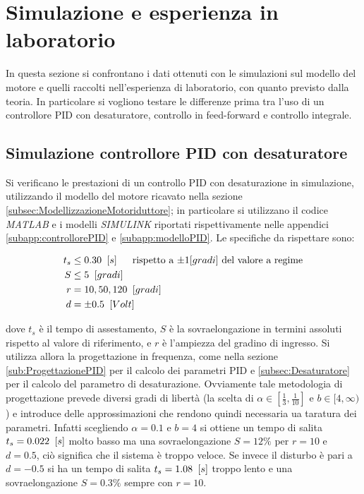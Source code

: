 \section{Simulazione e esperienza in laboratorio}
\label{sec:simLab}

	In questa sezione si confrontano i dati ottenuti con le simulazioni sul modello del motore e quelli raccolti nell'esperienza di laboratorio, con quanto previsto dalla teoria. In particolare si vogliono testare le differenze prima tra l'uso di un controllore PID con desaturatore, controllo in feed-forward e controllo integrale.
	
	\subsection{Simulazione controllore PID con desaturatore}
	\label{subsec:PIDvsPIDdesa}
	
		Si verificano le prestazioni di un controllo PID con desaturazione in simulazione, utilizzando il modello del motore ricavato nella sezione \ref{subsec:ModellizzazioneMotoriduttore}; in particolare si utilizzano il codice \textit{MATLAB} e i modelli \textit{SIMULINK} riportati rispettivamente nelle appendici \ref{subapp:controllorePID} e \ref{subapp:modelloPID}. 
		\newline Le specifiche da rispettare sono:
		
		\begin{align*}
			t_s &\le 0.30 \singleSpacing [s] \trippleSpacing \textnormal{rispetto a $\pm 1 [gradi]$ del valore a regime} \\
			S &\le 5 \singleSpacing [gradi] \\
			r &= 10,50,120 \singleSpacing [gradi] \\
			d &= \pm 0.5 \singleSpacing [Volt] \\
		\end{align*}
		
		\noindent dove $t_s$ è il tempo di assestamento, $S$ è la sovraelongazione in termini assoluti rispetto al valore di
		riferimento, e $r$ è l'ampiezza del gradino di ingresso. Si utilizza allora la progettazione in frequenza, come nella sezione \ref{sub:ProgettazionePID} per il calcolo dei parametri PID e \ref{subsec:Desaturatore} per il calcolo del parametro di desaturazione. Ovviamente tale metodologia di progettazione prevede diversi gradi di libertà (la scelta di $\alpha \in [\frac{1}{3},\frac{1}{10}]
		$ e $b \in [4, \infty)$) e introduce delle approssimazioni che rendono quindi necessaria ua taratura dei parametri. Infatti scegliendo $\alpha=0.1$ e $b=4$ si ottiene un tempo di salita $t_s=0.022 \singleSpacing [s]$ molto basso ma una sovraelongazione $S=12\%$ per $r=10$ e $d=0.5$, ciò significa che il sistema è troppo veloce. Se invece il disturbo è pari a $d=-0.5$ si ha un tempo di salita $t_s=1.08 \singleSpacing [s]$ troppo lento e una sovraelongazione $S=0.3\%$ sempre con $r=10$.
		
